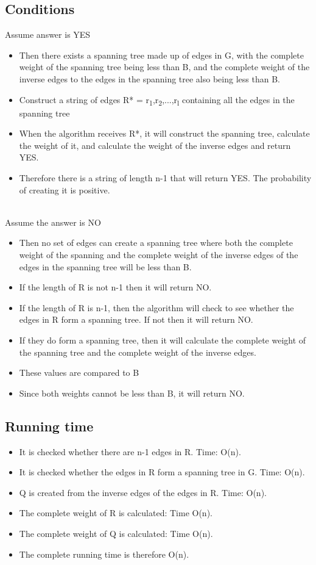 \documentclass[11pt,a4paper]{article}
\begin{document}
\subsection{Conditions}
Assume answer is YES
\begin{itemize}
\item Then there exists a spanning tree made up of edges in G, with the complete weight of the spanning tree being less than B, and the complete weight of the inverse edges to the edges in the spanning tree also being less than B.
\item Construct a string of edges R* = r\textsubscript{1},r\textsubscript{2},...,r\textsubscript{l} containing all the edges in the spanning tree
\item When the algorithm receives R*, it will construct the spanning tree, calculate the weight of it, and calculate the weight of the inverse edges and return YES.
\item Therefore there is a string of length n-1 that will return YES. The probability of creating it is positive.\\\\
\end{itemize}
Assume the answer is NO
\begin{itemize}
\item Then no set of edges can create a spanning tree where both the complete weight of the spanning and the complete weight of the inverse edges of the edges in the spanning tree will be less than B.
\item If the length of R is not n-1 then it will return NO.
\item If the length of R is n-1, then the algorithm will check to see whether the edges in R form a spanning tree. If not then it will return NO.
\item If they do form a spanning tree, then it will calculate the complete weight of the spanning tree and the complete weight of the inverse edges.
\item These values are compared to B
\item Since both weights cannot be less than B, it will return NO.\\
\end{itemize}
\subsection{Running time}
\begin{itemize}
\item It is checked whether there are n-1 edges in R. Time: O(n).
\item It is checked whether the edges in R form a spanning tree in G. Time: O(n).
\item Q is created from the inverse edges of the edges in R. Time: O(n).
\item The complete weight of R is calculated: Time O(n).
\item The complete weight of Q is calculated: Time O(n).
\item The complete running time is therefore O(n).
\end{itemize}
\end{document}
